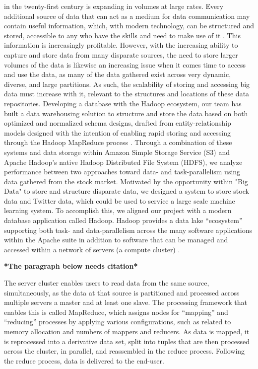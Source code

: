 \documentclass[journal]{IEEEtran}
\begin{document}
 in the twenty-first century is expanding in volumes
 at large rates. 
Every additional source of data that can act as a
 medium for data communication may contain useful information, which,
 with modern technology, can be structured and stored, accessible to any
 who have the skills and need to make use of it \cite{BigDataComputing}. 
This information is increasingly profitable. 
However, with the increasing ability to capture and store data from many
 disparate sources, the need to store larger volumes of the data is
 likewise an increasing issue when it comes time to access and use the data,
 as many of the data gathered exist across very dynamic, diverse, and
 large partitions. 
As such, the scalability of storing and accessing big data must increase
 with it, relevant to the structures and locations of these data repositories. 
Developing a database with the Hadoop ecosystem, our team has built a data
 warehousing solution to structure and store the data based on both
 optimized and normalized schema designs, drafted from entity-relationship
 models designed with the intention of enabling rapid storing and accessing
 through the Hadoop MapReduce process \cite{BigDataComputing}. 
Through a combination of these systems and data storage within
 Amazon Simple Storage Service (S3) and Apache Hadoop's native Hadoop
 Distributed File System (HDFS), we analyze performance between two
 approaches toward data- and task-parallelism using data gathered from
 the stock market.
Motivated by the opportunity within "Big Data" to store and structure disparate data,
 we designed a system to store stock data and Twitter data,
 which could be used to service a large scale machine learning system.
To accomplish this, we aligned our project with a modern database
 application called Hadoop. 
Hadoop provides a data lake ``ecosystem'' 
supporting both task- and data-parallelism across the many software
applications within the Apache suite in addition to software that can 
be managed and accessed within a network of servers (a compute cluster)
 \cite{Intel, BigDataComputing}.



\textbf{*The paragraph below needs citation*}



The server cluster enables users to read data from the same source,
 simultaneously, as the data at that source is partitioned and
 processed across multiple servers \textemdash a master and at least one slave. 
The processing framework that enables this is called MapReduce, 
which assigns nodes for ``mapping'' and ``reducing'' processes by applying  
various configurations, such as related to memory allocation and numbers
of mappers and reducers. 
As data is mapped, it is reprocessed into a derivative data set,
 split into tuples that are then processed across the cluster, in parallel,
 and reassembled in the reduce process. 
Following the reduce process, data is delivered to the end-user.
\end{document}
